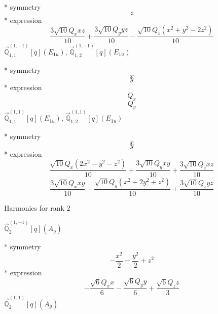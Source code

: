 \documentclass[fleqn,8pt]{jsarticle}
\begin{document}
\noindent\quad ** symmetry
\begin{dmath*}
z
\end{dmath*}
\noindent\quad ** expression
\begin{dmath*}
\frac{3 \sqrt{10} Q_{x} x z}{10} + \frac{3 \sqrt{10} Q_{y} y z}{10} - \frac{\sqrt{10} Q_{z} \left(x^{2} + y^{2} - 2 z^{2}\right)}{10}
\end{dmath*}
\noindent\quad $\vec{\mathbb{Q}}_{1,1}^{(1,-1)}[q](E_{1u})$, $\vec{\mathbb{Q}}_{1,2}^{(1,-1)}[q](E_{1u})$

\noindent\quad ** symmetry
\begin{dmath*}
x
\end{dmath*}
\begin{dmath*}
y
\end{dmath*}
\noindent\quad ** expression
\begin{dmath*}
Q_{x}
\end{dmath*}
\begin{dmath*}
Q_{y}
\end{dmath*}
\noindent\quad $\vec{\mathbb{Q}}_{1,1}^{(1,1)}[q](E_{1u})$, $\vec{\mathbb{Q}}_{1,2}^{(1,1)}[q](E_{1u})$

\noindent\quad ** symmetry
\begin{dmath*}
x
\end{dmath*}
\begin{dmath*}
y
\end{dmath*}
\noindent\quad ** expression
\begin{dmath*}
\frac{\sqrt{10} Q_{x} \left(2 x^{2} - y^{2} - z^{2}\right)}{10} + \frac{3 \sqrt{10} Q_{y} x y}{10} + \frac{3 \sqrt{10} Q_{z} x z}{10}
\end{dmath*}
\begin{dmath*}
\frac{3 \sqrt{10} Q_{x} x y}{10} - \frac{\sqrt{10} Q_{y} \left(x^{2} - 2 y^{2} + z^{2}\right)}{10} + \frac{3 \sqrt{10} Q_{z} y z}{10}
\end{dmath*}

\noindent * Harmonics for rank 2

\noindent\quad $\vec{\mathbb{Q}}_{2}^{(1,-1)}[q](A_{g})$

\noindent\quad ** symmetry
\begin{dmath*}
- \frac{x^{2}}{2} - \frac{y^{2}}{2} + z^{2}
\end{dmath*}
\noindent\quad ** expression
\begin{dmath*}
- \frac{\sqrt{6} Q_{x} x}{6} - \frac{\sqrt{6} Q_{y} y}{6} + \frac{\sqrt{6} Q_{z} z}{3}
\end{dmath*}
\noindent\quad $\vec{\mathbb{Q}}_{2}^{(1,1)}[q](A_{g})$
\end{document}
